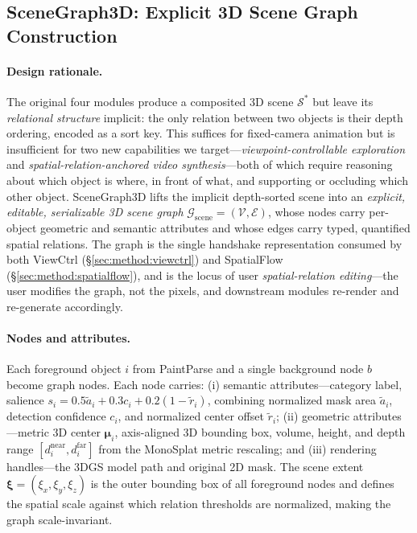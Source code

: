 
\subsection{SceneGraph3D: Explicit 3D Scene Graph Construction}
\label{sec:method:scenegraph3d}

\paragraph{Design rationale.}
The original four modules produce a composited 3D scene
$\mathcal{S}^*$ but leave its \emph{relational structure} implicit: the
only relation between two objects is their depth ordering, encoded as a
sort key. This suffices for fixed-camera animation but is insufficient
for two new capabilities we target---\emph{viewpoint-controllable
exploration} and \emph{spatial-relation-anchored video synthesis}---both
of which require reasoning about which object is where, in front of
what, and supporting or occluding which other object. SceneGraph3D
lifts the implicit depth-sorted scene into an \emph{explicit, editable,
serializable 3D scene graph} $\mathcal{G}_\text{scene} = (\mathcal{V},
\mathcal{E})$, whose nodes carry per-object geometric and semantic
attributes and whose edges carry typed, quantified spatial relations.
The graph is the single handshake representation consumed by both
ViewCtrl (\S\ref{sec:method:viewctrl}) and SpatialFlow
(\S\ref{sec:method:spatialflow}), and is the locus of user
\emph{spatial-relation editing}---the user modifies the graph, not the
pixels, and downstream modules re-render and re-generate accordingly.

\paragraph{Nodes and attributes.}
Each foreground object $i$ from PaintParse and a single background
node $b$ become graph nodes. Each node carries:
(i) semantic attributes---category label, salience
$s_i = 0.5\tilde{a}_i + 0.3 c_i + 0.2(1 - \tilde{r}_i)$, combining
normalized mask area $\tilde{a}_i$, detection confidence $c_i$, and
normalized center offset $\tilde{r}_i$;
(ii) geometric attributes---metric 3D center
$\boldsymbol{\mu}_i$, axis-aligned 3D bounding box, volume, height,
and depth range $[d_i^\text{near}, d_i^\text{far}]$ from the
MonoSplat metric rescaling; and
(iii) rendering handles---the 3DGS model path and original 2D mask.
The scene extent
$\boldsymbol{\xi} = (\xi_x, \xi_y, \xi_z)$ is the outer bounding box
of all foreground nodes and defines the spatial scale against which
relation thresholds are normalized, making the graph
scale-invariant.

